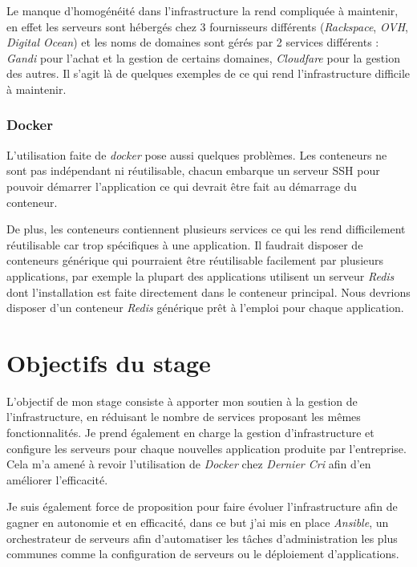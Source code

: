 \bigskip

Le manque d'homogénéité dans l'infrastructure la rend compliquée à
maintenir, en effet les serveurs sont hébergés chez 3 fournisseurs
différents (\emph{Rackspace}, \emph{OVH}, \emph{Digital Ocean}) et les
noms de domaines sont gérés par 2 services différents : \emph{Gandi}
pour l'achat et la gestion de certains domaines, \emph{Cloudfare} pour
la gestion des autres. Il s'agit là de quelques exemples de ce qui rend
l'infrastructure difficile à maintenir.

\subsubsection{Docker}\label{docker}

L'utilisation faite de \emph{docker} pose aussi quelques problèmes. Les
conteneurs ne sont pas indépendant ni réutilisable, chacun embarque un
serveur SSH pour pouvoir démarrer l'application ce qui devrait être fait
au démarrage du conteneur.

\bigskip

De plus, les conteneurs contiennent plusieurs services ce qui les rend
difficilement réutilisable car trop spécifiques à une application. Il
faudrait disposer de conteneurs générique qui pourraient être
réutilisable facilement par plusieurs applications, par exemple la
plupart des applications utilisent un serveur \emph{Redis} dont
l'installation est faite directement dans le conteneur principal. Nous
devrions disposer d'un conteneur \emph{Redis} générique prêt à l'emploi
pour chaque application.

\newpage

\section{Objectifs du stage}\label{objectifs-du-stage}

L'objectif de mon stage consiste à apporter mon soutien à la gestion de
l'infrastructure, en réduisant le nombre de services proposant les mêmes
fonctionnalités. Je prend également en charge la gestion
d'infrastructure et configure les serveurs pour chaque nouvelles
application produite par l'entreprise. Cela m'a amené à revoir
l'utilisation de \emph{Docker} chez \emph{Dernier Cri} afin d'en
améliorer l'efficacité.

\bigskip

Je suis également force de proposition pour faire évoluer
l'infrastructure afin de gagner en autonomie et en efficacité, dans ce
but j'ai mis en place \emph{Ansible}, un orchestrateur de serveurs afin
d'automatiser les tâches d'administration les plus communes comme la
configuration de serveurs ou le déploiement d'applications.

